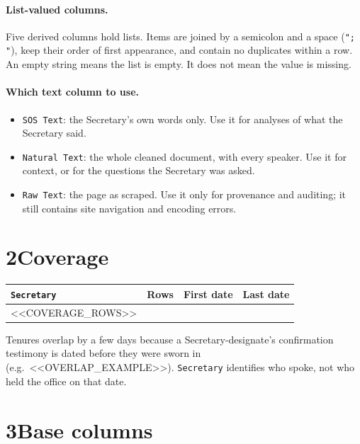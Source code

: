 \documentclass[10pt]{article}
\newcommand{\col}[1]{\texttt{#1}}
\begin{document}
\paragraph{List-valued columns.} Five derived columns hold lists. Items are
joined by a semicolon and a space (\texttt{"; "}), keep their order of first
appearance, and contain no duplicates within a row. An empty string means the
list is empty. It does not mean the value is missing.

\paragraph{Which text column to use.}
\begin{itemize}
\item \col{SOS Text}: the Secretary's own words only. Use it for analyses of what the Secretary said.
\item \col{Natural Text}: the whole cleaned document, with every speaker. Use it for context, or for the questions the Secretary was asked.
\item \col{Raw Text}: the page as scraped. Use it only for provenance and auditing; it still contains site navigation and encoding errors.
\end{itemize}

\section*{2\quad Coverage}

\begin{center}
\begin{tabular}{lrll}
\toprule
\col{Secretary} & Rows & First date & Last date \\
\midrule
<<COVERAGE_ROWS>>
\bottomrule
\end{tabular}
\end{center}
{\small Tenures overlap by a few days because a Secretary-designate's confirmation
testimony is dated before they were sworn in (e.g.\ <<OVERLAP_EXAMPLE>>). \col{Secretary} identifies who spoke, not who held the office on
that date.}

\section*{3\quad Base columns}
\end{document}

